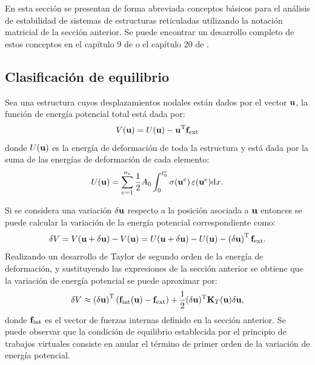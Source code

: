 En esta sección se presentan de forma abreviada conceptos básicos para el análisis de estabilidad de sistemas de estructuras reticuladas utilizando la notación matricial de la sección anterior. %
%
Se puede encontrar un desarrollo completo de estos conceptos en el capítulo 9 de \citep{crisfield1996non} o el capítulo 20 de \citep{Crisfield1997}.


\subsection{Clasificación de equilibrio}

Sea una estructura cuyos desplazamientos nodales están dados por el vector ${\bf u}$, la función de energía potencial total está dada por:
%
\begin{equation}
V({\bf u}) = U ({\bf u}) - {\bf u}^{\text{T}} {\bf f}_{\text{ext}}
\end{equation}
%
donde $U({\bf u})$ es la energía de deformación de toda la estructura y está dada por la suma de las energías de deformación de cada elemento:
%
\begin{equation}
U({\bf u}) = \sum_{e=1}^{n_e} \frac{1}{2} A_0 \int_0^{\ell_0^e} \sigma ({\bf u}^e) \, \varepsilon({\bf u}^e) {\text{d}} x.
\end{equation}

Si se considera una variación $\delta {\bf u}$ respecto a la posición asociada a ${\bf u}$ entonces se puede calcular la variación de la energía potencial correspondiente como:
%
\begin{equation}
\delta V = V ( {\bf u} + \delta {\bf u}) - V({\bf u}) = U ( {\bf u} + \delta {\bf u}) - U({\bf u}) - \left( \delta {\bf u}\right)^{\text{T}} {\bf f}_{\text{ext}}.
\end{equation}
%
Realizando un desarrollo de Taylor de segundo orden de la energía de deformación, y sustituyendo las expresiones de la sección anterior se obtiene que la variación de energía potencial se puede aproximar por:
%
\begin{equation}
\delta V \approx \left( \delta {\bf u}\right)^{\text{T}}  \left({\bf f}_{\text{int}}({\bf u}) - {\bf f}_{\text{ext}} \right) + \frac{1}{2} ( \delta {\bf u})^{\text{T}} {\bf K}_T({\bf u}) \delta {\bf u},
\end{equation}
%
donde ${\bf f}_{\text{int}}$ es el vector de fuerzas internas definido en la sección anterior. %
%
Se puede observar que la condición de equilibrio establecida por el principio de trabajos virtuales consiste en anular el término de primer orden de la variación de energía potencial. %


